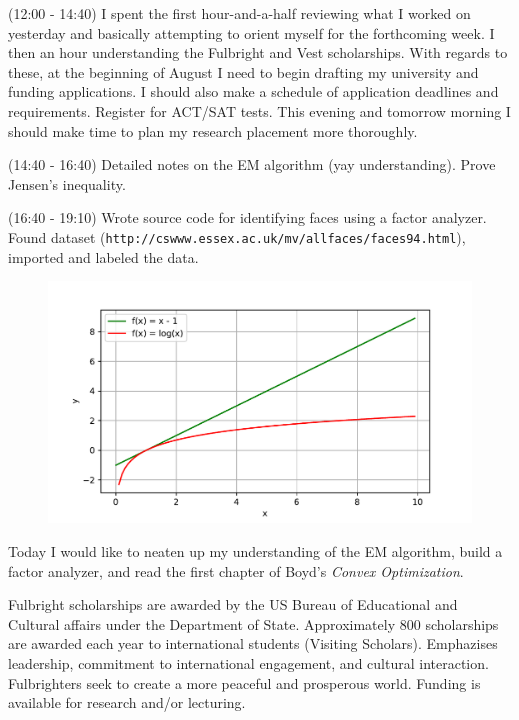 \documentclass[idxtotoc,hyperref,openany]{labbook} %
\begin{document}
  (12:00 - 14:40) I spent the first hour-and-a-half reviewing what I worked on yesterday and basically attempting to orient myself for the forthcoming week. I then an hour understanding the Fulbright and Vest scholarships. With regards to these, at the beginning of August I need to begin drafting my university and funding applications. I should also make a schedule of application deadlines and requirements. Register for ACT/SAT tests. This evening and tomorrow morning I should make time to plan my research placement more thoroughly.
 
 (14:40 - 16:40) Detailed notes on the EM algorithm (yay understanding). Prove Jensen's inequality.
 
 (16:40 - 19:10) Wrote source code for identifying faces using a factor analyzer. Found dataset (\texttt{http://cswww.essex.ac.uk/mv/allfaces/faces94.html}), imported and labeled the data.
 
 \begin{figure}
 \includegraphics[width=\textwidth]{log_vs_lin.pdf}
 \caption{}
 \label{fig:log_vs_lin}
 \end{figure}
 
 Today I would like to neaten up my understanding of the EM algorithm, build a factor analyzer, and read the first chapter of Boyd's \emph{Convex Optimization}.
 
 Fulbright scholarships are awarded by the US Bureau of Educational and Cultural affairs under the Department of State. Approximately 800 scholarships are awarded each year to international students (Visiting Scholars). Emphazises leadership, commitment to international engagement, and cultural interaction. Fulbrighters seek to create a more peaceful and prosperous world. Funding is available for research and/or lecturing.
 
\end{document}
